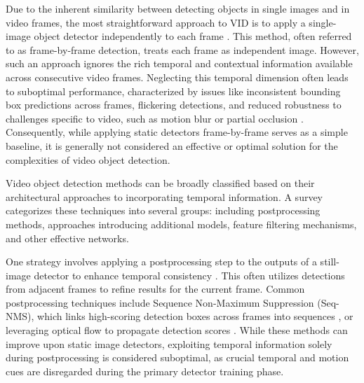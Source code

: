 Due to the inherent similarity between detecting objects in single images and in video frames, the most straightforward approach to VID is to apply a single-image object detector independently to each frame \cite{placeholder_static_detector_for_vid}. This method, often referred to as frame-by-frame detection, treats each frame as independent image. However, such an approach ignores the rich temporal and contextual information available across consecutive video frames. Neglecting this temporal dimension often leads to suboptimal performance, characterized by issues like inconsistent bounding box predictions across frames, flickering detections, and reduced robustness to challenges specific to video, such as motion blur or partial occlusion \cite{placeholder_vid_limitations_survey}. Consequently, while applying static detectors frame-by-frame serves as a simple baseline, it is generally not considered an effective or optimal solution for the complexities of video object detection.




Video object detection methods can be broadly classified based on their architectural approaches to incorporating temporal information. A survey \cite{jiaoNewGenerationDeep2022} categorizes these techniques into several groups: including postprocessing methods, approaches introducing additional models, feature filtering mechanisms, and other effective networks.

One strategy involves applying a postprocessing step to the outputs of a still-image detector to enhance temporal consistency \cite{hanSeqNMSVideoObject2016, kangTCNNTubeletsConvolutional2018, kangObjectDetectionVideo2016}. This often utilizes detections from adjacent frames to refine results for the current frame. Common postprocessing techniques include Sequence Non-Maximum Suppression (Seq-NMS), which links high-scoring detection boxes across frames into sequences \cite{hanSeqNMSVideoObject2016}, or leveraging optical flow to propagate detection scores \cite{kangTCNNTubeletsConvolutional2018, kangObjectDetectionVideo2016, zhuFlowGuidedFeature2017}. While these methods can improve upon static image detectors, exploiting temporal information solely during postprocessing is considered suboptimal, as crucial temporal and motion cues are disregarded during the primary detector training phase.

